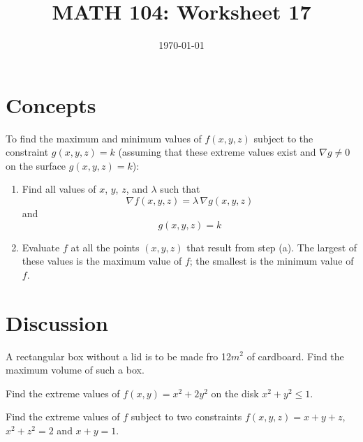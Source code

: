 \documentclass[12pt]{amsart}
\title{ MATH 104: Worksheet 17}
\author{}
\date{\today}
\begin{document}
\maketitle

\section{Concepts}


\begin{theorem}
	To find the maximum and minimum values of $f(x, y, z)$ subject to the constraint $g(x, y, z) = k$ (assuming that these extreme values exist and $\nabla g \ne 0$ on the surface $g(x, y, z) = k$):

	\begin{enumerate}
		\item Find all values of $x$, $y$, $z$, and $\lambda$ such that
		      \[
			      \nabla f(x, y, z) = \lambda \, \nabla g(x, y, z)
		      \]
		      and
		      \[
			      g(x, y, z) = k
		      \]

		\item Evaluate $f$ at all the points $(x, y, z)$ that result from step (a). The largest of these values is the maximum value of $f$; the smallest is the minimum value of $f$.
	\end{enumerate}
\end{theorem}

\section{Discussion}

\begin{question}
	A rectangular box without a lid is to be made fro 12$m^2$ of cardboard.
	Find the maximum volume of such a box.
\end{question}

\vspace{7cm}

\begin{question}
	Find the extreme values of $f(x,y) = x^2 + 2y^2$ on the disk
	$x^2 + y^2 \leq 1$.
\end{question}

\vspace{7cm}
\begin{question}
	Find the extreme values of $f$ subject to two constraints
	$f(x,y,z) = x + y + z$, $x^2 + z^2 = 2$ and $x + y =1$.
\end{question}

\vspace{7cm}
\end{document}
